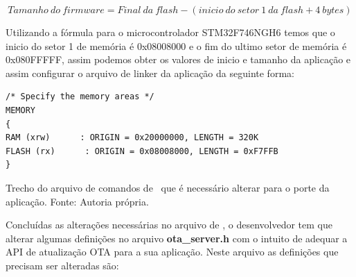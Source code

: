 \begin{equation}
    Tamanho\ do\ firmware = Final\ da\ flash - (inicio\ do\ setor\ 1\ da\ flash + 4\ bytes) 
    \label{eq:calculo_flash}
\end{equation}


Utilizando a fórmula para o microcontrolador STM32F746NGH6 temos que o inicio do setor 1 de memória é 0x08008000 e o fim do ultimo setor de memória é 0x080FFFFF, assim podemos obter os valores de inicio e tamanho da aplicação e assim configurar o arquivo de linker da aplicação da seguinte forma:


\begin{algorithm}[H]
\begin{lstlisting}
/* Specify the memory areas */
MEMORY
{
RAM (xrw)      : ORIGIN = 0x20000000, LENGTH = 320K
FLASH (rx)      : ORIGIN = 0x08008000, LENGTH = 0xF7FFB
}
\end{lstlisting}
\caption{Trecho do arquivo de comandos de \linker\ que é necessário alterar para o porte da aplicação.
\newline Fonte: Autoria própria.}
\end{algorithm}

Concluídas as alterações necessárias no arquivo de \linker, o desenvolvedor tem que alterar algumas definições no arquivo \textbf{ota\_server.h} com o intuito de adequar a API de atualização OTA para a sua aplicação. Neste arquivo as definições que precisam ser alteradas são:

